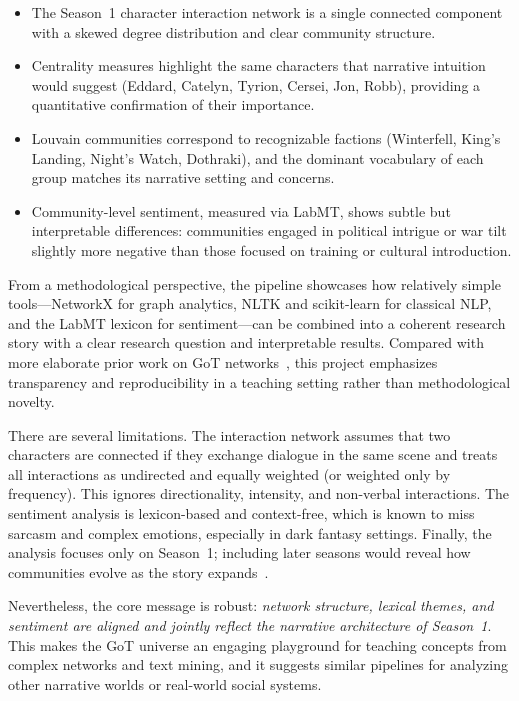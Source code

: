 \documentclass[9pt,twocolumn,twoside]{pnas-new}
\begin{document}
\begin{itemize}
    \item The Season~1 character interaction network is a single connected component with a skewed degree distribution and clear community structure.
    \item Centrality measures highlight the same characters that narrative intuition would suggest (Eddard, Catelyn, Tyrion, Cersei, Jon, Robb), providing a quantitative confirmation of their importance.
    \item Louvain communities correspond to recognizable factions (Winterfell, King’s Landing, Night’s Watch, Dothraki), and the dominant vocabulary of each group matches its narrative setting and concerns.
    \item Community-level sentiment, measured via LabMT, shows subtle but interpretable differences: communities engaged in political intrigue or war tilt slightly more negative than those focused on training or cultural introduction.
\end{itemize}

From a methodological perspective, the pipeline showcases how relatively simple tools---NetworkX for graph analytics, NLTK and scikit-learn for classical NLP, and the LabMT lexicon for sentiment---can be combined into a coherent research story with a clear research question and interpretable results. Compared with more elaborate prior work on GoT networks~\cite{beveridge2016,liu2017}, this project emphasizes transparency and reproducibility in a teaching setting rather than methodological novelty.

There are several limitations. The interaction network assumes that two characters are connected if they exchange dialogue in the same scene and treats all interactions as undirected and equally weighted (or weighted only by frequency). This ignores directionality, intensity, and non-verbal interactions. The sentiment analysis is lexicon-based and context-free, which is known to miss sarcasm and complex emotions, especially in dark fantasy settings. Finally, the analysis focuses only on Season~1; including later seasons would reveal how communities evolve as the story expands~\cite{breja2021}.

Nevertheless, the core message is robust: \emph{network structure, lexical themes, and sentiment are aligned and jointly reflect the narrative architecture of Season~1}. This makes the GoT universe an engaging playground for teaching concepts from complex networks and text mining, and it suggests similar pipelines for analyzing other narrative worlds or real-world social systems.
\end{document}
